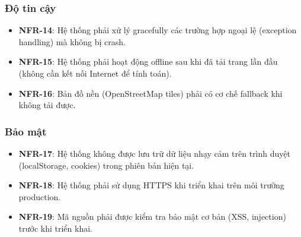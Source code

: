 \subsubsection{Độ tin cậy}
\begin{itemize}
    \item \textbf{NFR-14}: Hệ thống phải xử lý gracefully các trường hợp ngoại lệ (exception handling) mà không bị crash.
    \item \textbf{NFR-15}: Hệ thống phải hoạt động offline sau khi đã tải trang lần đầu (không cần kết nối Internet để tính toán).
    \item \textbf{NFR-16}: Bản đồ nền (OpenStreetMap tiles) phải có cơ chế fallback khi không tải được.
\end{itemize}

\subsubsection{Bảo mật}
\begin{itemize}
    \item \textbf{NFR-17}: Hệ thống không được lưu trữ dữ liệu nhạy cảm trên trình duyệt (localStorage, cookies) trong phiên bản hiện tại.
    \item \textbf{NFR-18}: Hệ thống phải sử dụng HTTPS khi triển khai trên môi trường production.
    \item \textbf{NFR-19}: Mã nguồn phải được kiểm tra bảo mật cơ bản (XSS, injection) trước khi triển khai.
\end{itemize}